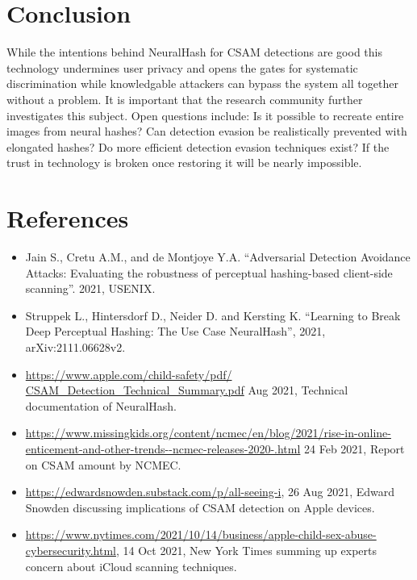 \documentclass[10pt,twocolumn,letterpaper]{article}
\newcounter{refcounter}
\newcommand{\dref}{\label{ref:\arabic{refcounter}}\item[\text{[\arabic{refcounter}]}]\setcounter{refcounter}{\the\numexpr\value{refcounter}+1}}
\newcommand{\clickable}[1]{\url{#1}}
\begin{document}
\section{Conclusion}

While the intentions behind NeuralHash for CSAM detections are good this technology undermines user privacy and opens the gates for systematic discrimination while knowledgable attackers can bypass the system all together without a problem. It is important that the research community further investigates this subject. Open questions include: Is it possible to recreate entire images from neural hashes? Can detection evasion be realistically prevented with elongated hashes? Do more efficient detection evasion techniques exist? If the trust in technology is broken once restoring it will be nearly impossible.

\section{References}

\begin{itemize}
	
	\dref Jain S., Cretu A.M., and de Montjoye Y.A. ``Adversarial Detection Avoidance Attacks: Evaluating the robustness of perceptual hashing-based client-side scanning''.  2021, USENIX.
	
	\dref Struppek L., Hintersdorf D., Neider D. and Kersting K.  ``Learning to Break Deep Perceptual Hashing: The Use Case NeuralHash'', 2021, arXiv:2111.06628v2.
	
	\dref \clickable{https://www.apple.com/child-safety/pdf/
	CSAM\_Detection\_Technical\_Summary.pdf} Aug 2021, Technical documentation of NeuralHash.
	
	\dref \clickable{https://www.missingkids.org/content/ncmec/en/blog/2021/rise-in-online-enticement-and-other-trends--ncmec-releases-2020-.html} 24 Feb 2021, Report on CSAM amount by NCMEC.
	
	\dref \clickable{https://edwardsnowden.substack.com/p/all-seeing-i}, 26 Aug 2021, Edward Snowden discussing implications of CSAM detection on Apple devices.
	
	\dref \clickable{https://www.nytimes.com/2021/10/14/business/apple-child-sex-abuse-cybersecurity.html}, 14 Oct 2021, New York Times summing up experts concern about iCloud scanning techniques. 
	
\end{itemize}

 

{\small


}
\end{document}
